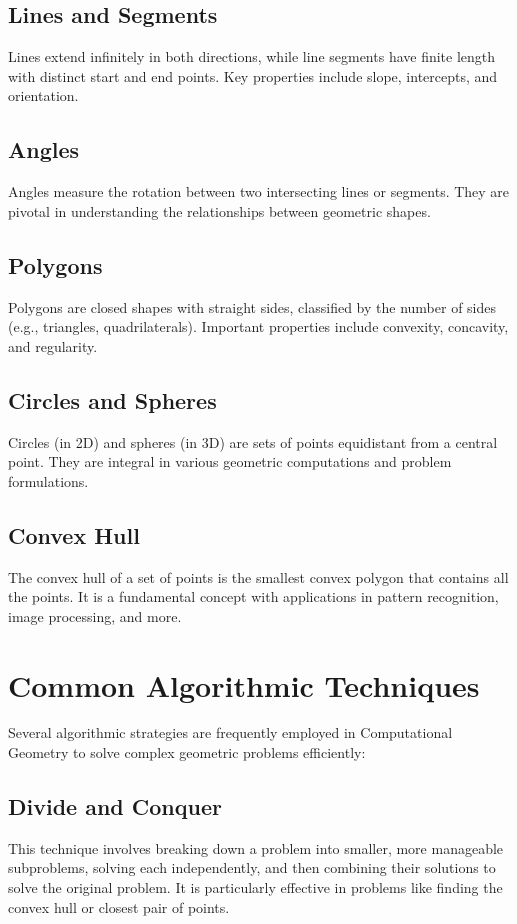 \subsection{Lines and Segments}
Lines extend infinitely in both directions, while line segments have finite length with distinct start and end points. Key properties include slope, intercepts, and orientation.

\subsection{Angles}
Angles measure the rotation between two intersecting lines or segments. They are pivotal in understanding the relationships between geometric shapes.

\subsection{Polygons}
Polygons are closed shapes with straight sides, classified by the number of sides (e.g., triangles, quadrilaterals). Important properties include convexity, concavity, and regularity.

\subsection{Circles and Spheres}
Circles (in 2D) and spheres (in 3D) are sets of points equidistant from a central point. They are integral in various geometric computations and problem formulations.

\subsection{Convex Hull}
The convex hull of a set of points is the smallest convex polygon that contains all the points. It is a fundamental concept with applications in pattern recognition, image processing, and more.

\section{Common Algorithmic Techniques}
Several algorithmic strategies are frequently employed in Computational Geometry to solve complex geometric problems efficiently:

\subsection{Divide and Conquer}
This technique involves breaking down a problem into smaller, more manageable subproblems, solving each independently, and then combining their solutions to solve the original problem. It is particularly effective in problems like finding the convex hull or closest pair of points.

